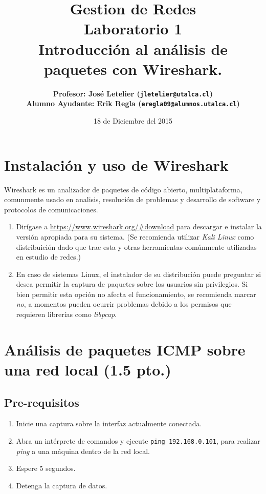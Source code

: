 \documentclass[11pt]{utalcaDoc}
\title{{\bf Gestion de Redes}\\Laboratorio 1\\Introducción al análisis de paquetes con Wireshark.}
\author{
    \bf{Profesor:} José Letelier (\texttt{jletelier@utalca.cl})\\ 
    \bf{Alumno Ayudante:} Erik Regla (\texttt{eregla09@alumnos.utalca.cl})\\ }
\date{18 de Diciembre del 2015}
\begin{document}
\renewcommand{\figurename}{Figura~}
\renewcommand{\tablename}{Tabla~}

\maketitle

\section{Instalación y uso de Wireshark}
Wireshark es un analizador de paquetes de código abierto, multiplataforma, 
comunmente usado en analisis, resolución de problemas y desarrollo de 
software y protocolos de comunicaciones.
\begin{enumerate}
    \item Dirígase a \url{https://www.wireshark.org/#download} para descargar 
    e instalar la versión apropiada para su sistema. (Se recomienda utilizar 
    \emph{Kali Linux} como distribuición dado que trae esta y otras herramientas
    comúnmente utilizadas en estudio de redes.)
    \item En caso de sistemas Linux, el instalador de su distribución puede preguntar
    si desea permitir la captura de paquetes sobre los usuarios sin privilegios.
    Si bien permitir esta opción no afecta el funcionamiento, se recomienda marcar
    \emph{no}, a momentos pueden ocurrir problemas debido a los permisos que requieren
    librerías como \emph{libpcap}.
\end{enumerate}

\section{Análisis de paquetes ICMP sobre una red local (1.5 pto.)}
\subsection{Pre-requisitos}
\begin{enumerate}
    \item{ Inicie una captura sobre la interfaz actualmente conectada. }
    \item{ Abra un intérprete de comandos y ejecute \texttt{ping 192.168.0.101},
    para realizar \emph{ping} a una máquina dentro de la red local. }
    \item{ Espere 5 segundos. }
    \item{ Detenga la captura de datos. }
\end{enumerate}
\end{document}
